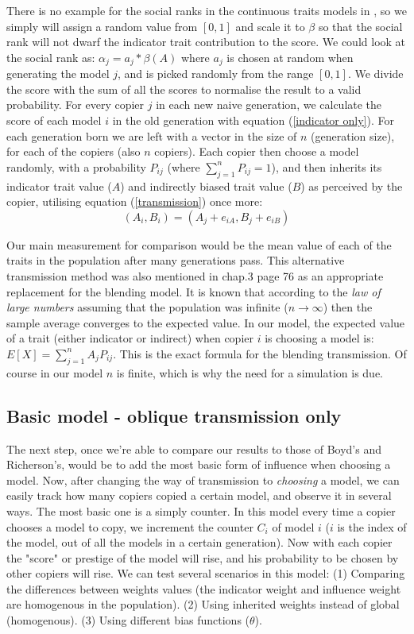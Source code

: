 \documentclass[11pt]{article}
\begin{document}
There is no example for the social ranks in the continuous traits models in \cite{evolutionBook}, so we simply will assign a random value from $[0,1]$ and scale it to $\beta$ so that the social rank will not dwarf the indicator trait contribution to the score. We could look at the social rank as: $\alpha_j=a_j * \beta(A)$ where $a_j$ is chosen at random when generating the model $j$, and is picked randomly from the range $[0,1]$.
We divide the score with the sum of all the scores to normalise the result to a valid probability.
For every copier $j$ in each new naive generation, we calculate the score of each model $i$ in the old generation with equation (\ref{indicator only}). For each generation born we are left with a vector in the size of $n$ (generation size), for each of the copiers (also $n$ copiers). Each copier then choose a model randomly, with a probability $P_{ij}$ (where $\sum\limits_{j=1}^{n} P_{ij} = 1$), and then inherits its indicator trait value ($A$) and indirectly biased trait value ($B$) as perceived by the copier, utilising equation (\ref{transmission}) once more:
  \begin{equation}
	(A_i,B_i) = (A_j + e_{iA}, B_j + e_{iB})
 \end{equation}
 
Our main measurement for comparison would be the mean value of each of the traits in the population after many generations pass. This alternative transmission method was also mentioned in \cite{evolutionBook} chap.3 page 76 as an appropriate replacement for the blending model. It is known that according to the \textit{law of large numbers} assuming that the population was infinite ($n \rightarrow \infty$) then the sample average converges to the expected value. In our model, the expected value of a trait (either indicator or indirect) when copier $i$ is choosing a model is: $E[X] = \sum\limits_{j=1}^{n} A_j P_{ij}$. This is the exact formula for the blending transmission. Of course in our model $n$ is finite, which is why the need for a simulation is due.

 \subsection{Basic model - oblique transmission only}\label{basic model}
 The next step, once we're able to compare our results to those of Boyd's and Richerson's, would be to add the most basic form of influence when choosing a model.
 Now, after changing the way of transmission to \textit{choosing} a model, we can easily track how many copiers copied a certain model, and observe it in several ways. The most basic one is a simply counter. In this model every time a copier chooses a model to copy, we increment the counter $C_i$ of model $i$ ($i$ is the index of the model, out of all the models in a certain generation). Now with each copier the "score" or prestige of the model will rise, and his probability to be chosen by other copiers will rise.
We can test several scenarios in this model: (1) Comparing the differences between weights values (the indicator weight and influence weight are homogenous in the population). (2) Using inherited weights instead of global (homogenous). (3) Using different bias functions ($\theta$).
\end{document}
